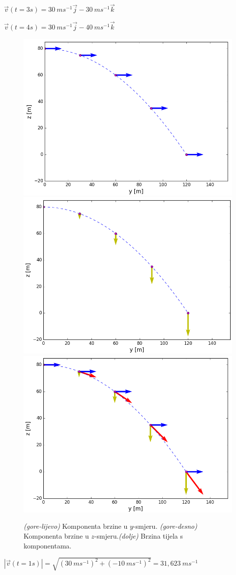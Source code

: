 \begin{enumerate}[label=\alph*)]
 $\vec{v}(t=3s)  =30\ ms^{-1}\vec{j}-30\ ms^{-1}\vec{k}$
  
 $\vec{v}(t=4s)  =30\ ms^{-1}\vec{j}-40\ ms^{-1}\vec{k}$
 
\begin{figure}
  \centering
  \includegraphics[width=0.4\linewidth]{../02_Kinematika_materijalne_tocke/brzina_y.png}
  \centering
  \includegraphics[width=.4\linewidth]{../02_Kinematika_materijalne_tocke/brzina_z.png}
\centering
  \includegraphics[width=.5\linewidth]{../02_Kinematika_materijalne_tocke/brzina_ukupna.png}
\caption{\textit{(gore-lijevo)} Komponenta brzine u $y$-smjeru. \textit{(gore-desno)} Komponenta brzine u $z$-smjeru.\textit{(dolje)} Brzina tijela s komponentama.}
\end{figure}

$|\vec{v}(t=1s)|  = \sqrt{ (30\ ms^{-1})^2 + (-10\ ms^{-1})^2 } = 31,623\ ms^{-1} $


\end{enumerate}

